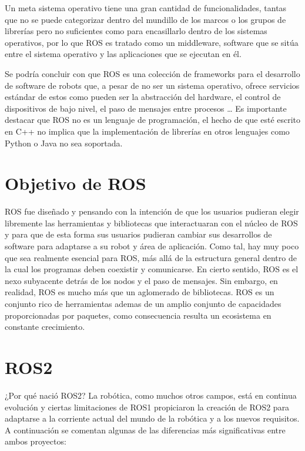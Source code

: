 Un meta sistema operativo tiene una gran cantidad de funcionalidades, tantas que no se puede categorizar dentro del mundillo de los marcos o los grupos de librerías pero no suficientes como para encasillarlo dentro de los sistemas operativos, por lo que ROS es tratado como un middleware, software que se sitúa entre el sistema operativo y las aplicaciones que se ejecutan en él.

Se podría concluir con que ROS es una colección de frameworks para el desarrollo de software de robots que, a pesar de no ser un sistema operativo, ofrece servicios estándar de estos como pueden ser la abstracción del hardware, el control de dispositivos de bajo nivel, el paso de mensajes entre procesos … Es importante destacar que ROS no es un lenguaje de programación, el hecho de que esté escrito en C++ no implica que la implementación de librerías en otros lenguajes como Python o Java no sea soportada.

\section{Objetivo de ROS}

ROS fue diseñado y pensando con la intención de que los usuarios pudieran elegir libremente las herramientas y bibliotecas que interactuaran con el núcleo de ROS y para que de esta forma sus usuarios pudieran cambiar sus desarrollos de software para adaptarse a su robot y área de aplicación. Como tal, hay muy poco que sea realmente esencial para ROS, más allá de la estructura general dentro de la cual los programas deben coexistir y comunicarse. En cierto sentido, ROS es el nexo subyacente detrás de los nodos y el paso de mensajes. Sin embargo, en realidad, ROS es mucho más que un aglomerado de bibliotecas. ROS es un conjunto rico de herramientas ademas de un amplio conjunto de capacidades proporcionadas por paquetes, como consecuencia resulta un ecosistema en constante crecimiento. 

\section{ROS2}

¿Por qué nació ROS2? La robótica, como muchos otros campos, está en continua evolución y ciertas limitaciones de ROS1 propiciaron la creación de ROS2 para adaptarse a la corriente actual del mundo de la robótica y a los nuevos requisitos. A continuación se comentan algunas de las diferencias más significativas entre ambos proyectos:

